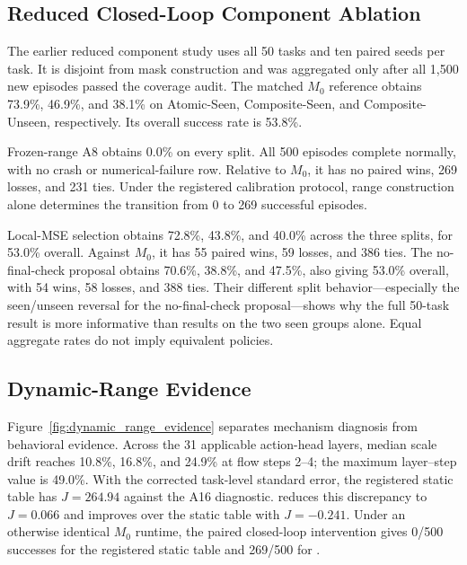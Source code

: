 \subsection{Reduced Closed-Loop Component Ablation}
\label{sec:component_rollout_detail}

The earlier reduced component study uses all 50 tasks and ten paired seeds per task. It is disjoint from mask construction and was aggregated only after all 1,500 new episodes passed the coverage audit. The matched $M_0$ reference obtains 73.9\%, 46.9\%, and 38.1\% on Atomic-Seen, Composite-Seen, and Composite-Unseen, respectively. Its overall success rate is 53.8\%.



Frozen-range A8 obtains 0.0\% on every split. All 500 episodes complete normally, with no crash or numerical-failure row. Relative to $M_0$, it has no paired wins, 269 losses, and 231 ties. Under the registered calibration protocol, range construction alone determines the transition from 0 to 269 successful episodes.

Local-MSE selection obtains 72.8\%, 43.8\%, and 40.0\% across the three splits, for 53.0\% overall. Against $M_0$, it has 55 paired wins, 59 losses, and 386 ties. The no-final-check proposal obtains 70.6\%, 38.8\%, and 47.5\%, also giving 53.0\% overall, with 54 wins, 58 losses, and 388 ties. Their different split behavior---especially the seen/unseen reversal for the no-final-check proposal---shows why the full 50-task result is more informative than results on the two seen groups alone. Equal aggregate rates do not imply equivalent policies.

\subsection{Dynamic-Range Evidence}
\label{sec:dynamic_range_visualization}



Figure~\ref{fig:dynamic_range_evidence} separates mechanism diagnosis from behavioral evidence. Across the 31 applicable action-head layers, median scale drift reaches 10.8\%, 16.8\%, and 24.9\% at flow steps 2--4; the maximum layer--step value is 49.0\%. With the corrected task-level standard error, the registered static table has $J=264.94$ against the A16 diagnostic. \dyrange reduces this discrepancy to $J=0.066$ and improves over the static table with $J=-0.241$. Under an otherwise identical $M_0$ runtime, the paired closed-loop intervention gives 0/500 successes for the registered static table and 269/500 for \dyrange.

